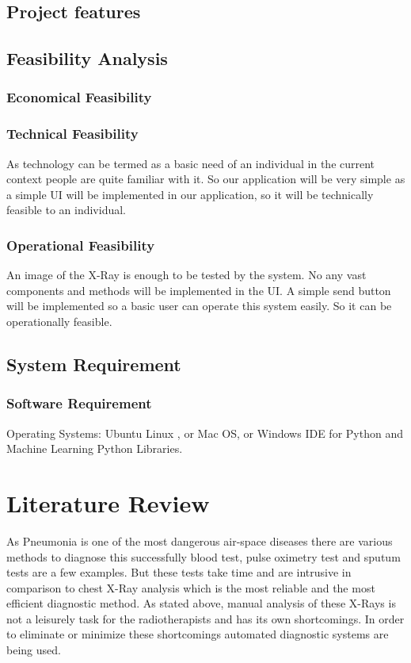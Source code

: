 \documentclass[12pt, a4paper]{report}
\begin{document}
\section{Project features}
\section{Feasibility Analysis}

\subsection{Economical Feasibility }

\subsection{Technical Feasibility}
As technology can be termed as a basic need of an individual in the current context people are quite familiar with it. So our application will be very simple as a simple UI will be implemented in our application, so it will be technically feasible to an individual. 

\subsection{Operational Feasibility}
An image of the X-Ray is enough to be tested by the system. No any vast components and methods will be implemented in the UI. A simple send button will be implemented so a basic user can operate this system easily. So it can be operationally feasible.
\section{System Requirement}
\subsection{Software Requirement}
Operating Systems: Ubuntu Linux , or Mac OS, or Windows 
 IDE for Python and Machine Learning Python Libraries.

\pagebreak
\chapter{Literature Review}

As Pneumonia is one of the most dangerous air-space diseases there are various methods to diagnose this successfully blood test, pulse oximetry test and sputum tests are a few examples. But these tests take time and are intrusive in comparison to chest X-Ray analysis which is the most reliable and the most efficient diagnostic method. As stated above, manual analysis of these X-Rays is not a leisurely task for the radiotherapists and has its own shortcomings. In order to eliminate or minimize these shortcomings automated diagnostic systems are being used.
\end{document}
